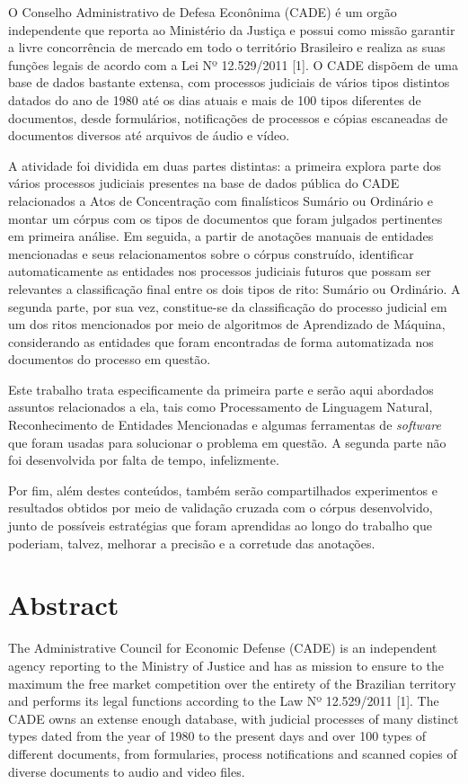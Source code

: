 \documentclass[11pt]{report}
\begin{document}
\indent\indent O Conselho Administrativo de Defesa Econônima (CADE) é um orgão independente que reporta ao Ministério da Justiça e possui como missão garantir a livre
concorrência de mercado em todo o território Brasileiro e realiza as suas funções legais de acordo com a Lei Nº 12.529/2011 [1].
O CADE dispõem de uma base de dados bastante extensa, com processos judiciais de vários tipos distintos datados do ano de 1980 até os dias atuais e mais de 100 tipos diferentes de
documentos, desde formulários, notificações de processos e cópias escaneadas de documentos diversos até arquivos de áudio e vídeo.

A atividade foi dividida em duas partes distintas: a primeira explora parte dos vários processos judiciais presentes na base de dados pública do CADE relacionados a Atos de
Concentração com finalísticos Sumário ou Ordinário e montar um córpus com os tipos de documentos que foram julgados pertinentes em primeira análise. Em seguida, a partir de anotações
manuais de entidades mencionadas e seus relacionamentos sobre o córpus construído, identificar automaticamente as entidades nos processos judiciais futuros que possam ser relevantes a classificação
final entre os dois tipos de rito: Sumário ou Ordinário. A segunda parte, por sua vez, constitue-se da classificação do processo judicial em um dos ritos mencionados por meio de
algoritmos de Aprendizado de Máquina, considerando as entidades que foram encontradas de forma automatizada nos documentos do processo em questão.

Este trabalho trata especificamente da primeira parte e serão aqui abordados assuntos relacionados a ela, tais como Processamento de Linguagem Natural, Reconhecimento de Entidades
Mencionadas e algumas ferramentas de \textit{software} que foram usadas para solucionar o problema em questão. A segunda parte não foi desenvolvida por falta de tempo, infelizmente.

Por fim, além destes conteúdos, também serão compartilhados experimentos e resultados obtidos por meio de validação cruzada com o córpus desenvolvido, junto de possíveis estratégias que
foram aprendidas ao longo do trabalho que poderiam, talvez, melhorar a precisão e a corretude das anotações.

\pagebreak
\thispagestyle{empty}
\chapter*{Abstract}

\indent\indent The Administrative Council for Economic Defense (CADE) is an independent agency reporting to the Ministry of Justice and has as mission to ensure to the maximum the free
market competition over the entirety of the Brazilian territory and performs its legal functions according to the Law Nº 12.529/2011 [1].
The CADE owns an extense enough database, with judicial processes of many distinct types dated from the year of 1980 to the present days and over 100 types of different documents,
from formularies, process notifications and scanned copies of diverse documents to audio and video files.
\end{document}
